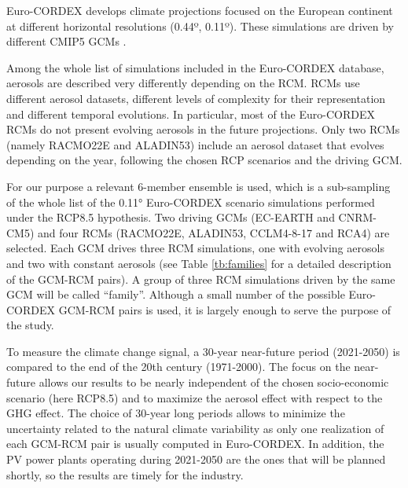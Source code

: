
Euro-CORDEX develops climate projections focused on the European continent at different horizontal resolutions (0.44º, 0.11º). These simulations are driven by different CMIP5 GCMs \cite*{Taylor2012}.

Among the whole list of simulations included in the Euro-CORDEX database, aerosols are described very differently depending on the RCM. RCMs use different aerosol datasets, different levels of complexity for their representation and different temporal evolutions. In particular, most of the Euro-CORDEX RCMs do not present evolving aerosols in the future projections. Only two RCMs (namely RACMO22E and ALADIN53) include an aerosol dataset that evolves depending on the year, following the chosen RCP scenarios and the driving GCM.

For our purpose a relevant 6-member ensemble is used, which is a sub-sampling of the whole list of the 0.11° Euro-CORDEX scenario simulations performed under the RCP8.5 hypothesis. Two driving GCMs (EC-EARTH and CNRM-CM5) and four RCMs (RACMO22E, ALADIN53, CCLM4-8-17 and RCA4) are selected. Each GCM drives three RCM simulations, one with evolving aerosols and two with constant aerosols (see Table \ref{tb:families} for a detailed description of the GCM-RCM pairs). A group of three RCM simulations driven by the same GCM will be called ``family''. Although a small number of the possible Euro-CORDEX GCM-RCM pairs is used, it is largely enough to serve the purpose of the study.

To measure the climate change signal, a 30-year near-future period (2021-2050) is compared to the end of the 20th century (1971-2000). The focus on the near-future allows our results to be nearly independent of the chosen socio-economic scenario (here RCP8.5) and to maximize the aerosol effect with respect to the GHG effect. The choice of 30-year long periods allows to minimize the uncertainty related to the natural climate variability as only one realization of each GCM-RCM pair is usually computed in Euro-CORDEX. In addition, the PV power plants operating during 2021-2050 are the ones that will be planned shortly, so the results are timely for the industry.

